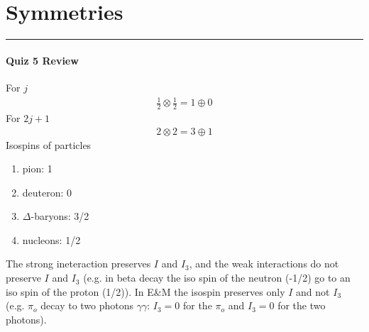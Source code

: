 \documentclass[../main.tex]{subfiles}
\begin{document}
\section{Symmetries}
\hrule \vspace{10px}

\paragraph{Quiz 5 Review}
For $j$
\begin{align*}
    \frac{1}{2} \otimes \frac{1}{2} = 1 \oplus 0
\end{align*}
For $2j + 1$
\begin{align*}
    2 \otimes 2 = 3 \oplus 1
\end{align*}
Isospins of particles
\begin{enumerate}
    \item pion: 1
    \item deuteron: 0
    \item $\Delta$-baryons: 3/2
    \item nucleons: 1/2
\end{enumerate}
The strong ineteraction preserves $I$ and $I_3$, and the weak interactions do not preserve $I$ and
$I_3$ (e.g. in beta decay the iso spin of the neutron (-1/2) go to an iso spin of the proton (1/2)).
In E\&M the isospin preserves only $I$ and not $I_3$ (e.g. $\pi_o$ decay to two photons
$\gamma \gamma$: $I_3 = 0$ for the $\pi_o$ and $I_3 = 0$ for the two photons).
\end{document}
